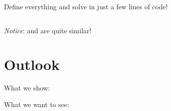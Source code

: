 \documentclass[10pt,utf8,compress,xcolor=dvipsnames]{beamer}
\begin{document}
\subsection{\PY}
\begin{frame}[fragile]{\insertsubsectionhead}
	Define everything and solve in just a few lines of code!\\[-0.15cm]
	\lstset{language = python}
	
	
\end{frame}
\subsection{\CPP}
\begin{frame}[fragile]{\insertsubsectionhead}
	
	{\em Notice}: \CPP and \PY are quite similar!\\[-0.15cm]
	\lstset{language = c++}
	
\end{frame}

\section{Outlook}

\begin{frame}[fragile]{\insertsectionhead}
	\begin{center}
		What we show:
	\end{center}

	\begin{center}
		What we want to see:
	\end{center}
\end{frame}
\end{document}
